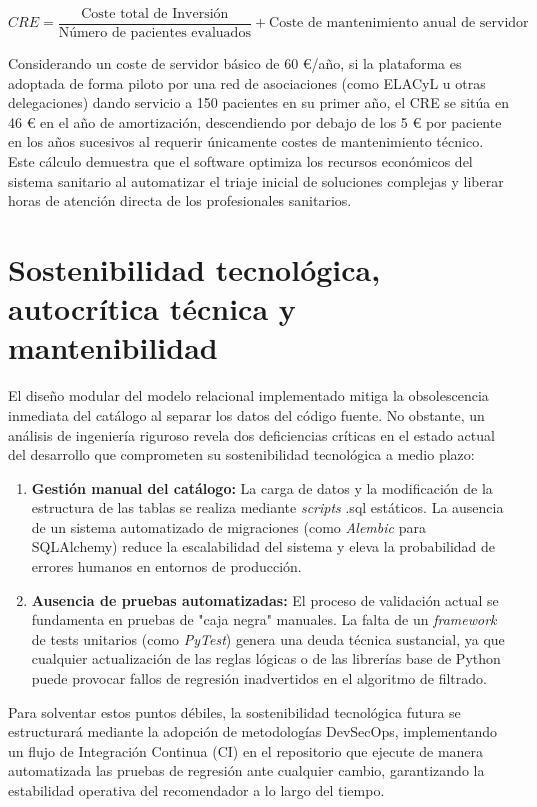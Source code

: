 $$CRE = \frac{\text{Coste total de Inversión}}{\text{Número de pacientes evaluados}} + \text{Coste de mantenimiento anual de servidor}$$

Considerando un coste de servidor básico de 60 €/año, si la plataforma es adoptada de forma piloto por una red de asociaciones (como ELACyL u otras delegaciones) dando servicio a 150 pacientes en su primer año, el CRE se sitúa en 46 € en el año de amortización, descendiendo por debajo de los 5 € por paciente en los años sucesivos al requerir únicamente costes de mantenimiento técnico. Este cálculo demuestra que el software optimiza los recursos económicos del sistema sanitario al automatizar el triaje inicial de soluciones complejas y liberar horas de atención directa de los profesionales sanitarios.

\section{Sostenibilidad tecnológica, autocrítica técnica y mantenibilidad}
El diseño modular del modelo relacional implementado mitiga la obsolescencia inmediata del catálogo al separar los datos del código fuente. No obstante, un análisis de ingeniería riguroso revela dos deficiencias críticas en el estado actual del desarrollo que comprometen su sostenibilidad tecnológica a medio plazo:

\begin{enumerate}
    	\item \textbf{Gestión manual del catálogo:} La carga de datos y la modificación de la estructura de las tablas se realiza mediante \textit{scripts} .sql estáticos. La ausencia de un sistema automatizado de migraciones (como \textit{Alembic} para SQLAlchemy) reduce la escalabilidad 		del sistema y eleva la probabilidad de errores humanos en entornos de producción.
    	\item \textbf{Ausencia de pruebas automatizadas:} El proceso de validación actual se fundamenta en pruebas de "caja negra" manuales. La falta de un \textit{framework} de tests unitarios (como \textit{PyTest}) genera una deuda técnica sustancial, ya que cualquier actualización de 		las reglas lógicas o de las librerías base de Python puede provocar fallos de regresión inadvertidos en el algoritmo de filtrado.
\end{enumerate}

Para solventar estos puntos débiles, la sostenibilidad tecnológica futura se estructurará mediante la adopción de metodologías DevSecOps, implementando un flujo de Integración Continua (CI) en el repositorio que ejecute de manera automatizada las pruebas de regresión ante cualquier cambio, garantizando la estabilidad operativa del recomendador a lo largo del tiempo.

